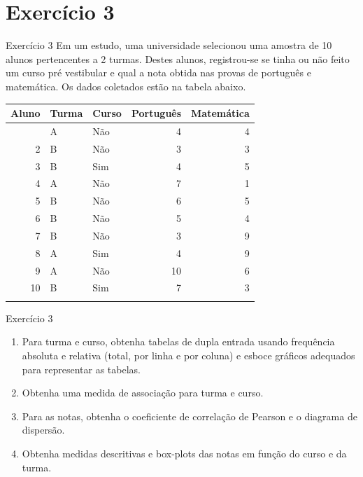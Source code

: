 \documentclass[
  ignorenonframetext,
  serif,
  professionalfont,
  usenames,
  dvipsnames,
  aspectratio = 169]{beamer}
\begin{document}
\section{Exercício 3}\label{exercuxedcio-3}

\begin{frame}{Exercício 3}
\label{exercuxedcio-3-1}
Em um estudo, uma universidade selecionou uma amostra de 10 alunos
pertencentes a 2 turmas. Destes alunos, registrou-se se tinha ou não
feito um curso pré vestibular e qual a nota obtida nas provas de
português e matemática. Os dados coletados estão na tabela abaixo.

\begin{longtable}[]{@{}rllrr@{}}
\toprule\noalign{}
Aluno & Turma & Curso & Português & Matemática \\
\midrule\noalign{}
\endhead
1 & A & Não & 4 & 4 \\
2 & B & Não & 3 & 3 \\
3 & B & Sim & 4 & 5 \\
4 & A & Não & 7 & 1 \\
5 & B & Não & 6 & 5 \\
6 & B & Não & 5 & 4 \\
7 & B & Não & 3 & 9 \\
8 & A & Sim & 4 & 9 \\
9 & A & Não & 10 & 6 \\
10 & B & Sim & 7 & 3 \\
\bottomrule\noalign{}
\end{longtable}
\end{frame}

\begin{frame}{Exercício 3}
\label{exercuxedcio-3-2}
\begin{enumerate}
\item
  Para turma e curso, obtenha tabelas de dupla entrada usando frequência
  absoluta e relativa (total, por linha e por coluna) e esboce gráficos
  adequados para representar as tabelas.
\item
  Obtenha uma medida de associação para turma e curso.
\item
  Para as notas, obtenha o coeficiente de correlação de Pearson e o
  diagrama de dispersão.
\item
  Obtenha medidas descritivas e box-plots das notas em função do curso e
  da turma.
\end{enumerate}
\end{frame}
\end{document}
